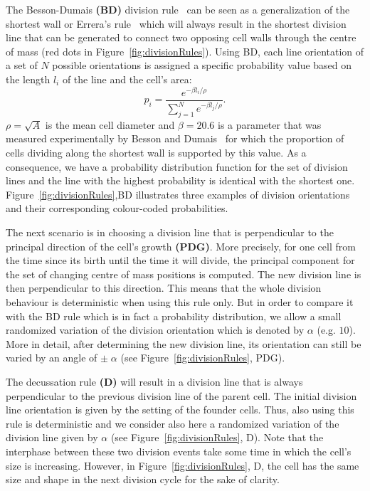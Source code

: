 \documentclass[11pt,a4paper, final]{article}
\begin{document}
The Besson-Dumais \textbf{(BD)} division rule~\cite{besson_and_dumais_2011} can be seen as a generalization of the shortest wall or Errera's rule~\cite{errera_1886} which will always result in the shortest division line that can be generated to connect two opposing cell walls through the centre of mass (red dots in Figure~\ref{fig:divisionRules}). Using BD, each line orientation of a set of $N$ possible orientations is assigned a specific probability value based on the length $l_i$ of the line and the cell's area:
\begin{equation}
p_i = \frac{e^{-\beta l_i / \rho}}{\sum_{j=1}^{N} e^{-\beta l_j / \rho}}.
\end{equation}
$\rho = \sqrt{A}$ is the mean cell diameter and $\beta = 20.6$ is a parameter that was measured experimentally by Besson and Dumais~\cite{besson_and_dumais_2011} for which the proportion of cells dividing along the shortest wall is supported by this value. As a consequence, we have a probability distribution function for the set of division lines and the line with the highest probability is identical with the shortest one. Figure~\ref{fig:divisionRules},BD illustrates three examples of division orientations and their corresponding colour-coded probabilities.

The next scenario is in choosing a division line that is perpendicular to the principal direction of the cell's growth \textbf{(PDG)}. More precisely, for one cell from the time since its birth until the time it will divide, the principal component for the set of changing centre of mass positions is computed. The new division line is then perpendicular to this direction. This means that the whole division behaviour is deterministic when using this rule only. But in order to compare it with the BD rule which is in fact a probability distribution, we allow a small randomized variation of the division orientation which is denoted by $\alpha$ (e.g. $10$). More in detail, after determining the new division line, its orientation can still be varied by an angle of $\pm \; \alpha$ (see Figure~\ref{fig:divisionRules}, PDG).

The decussation rule \textbf{(D)} will result in a division line that is always perpendicular to the previous division line of the parent cell. The initial division line orientation is given by the setting of the founder cells. Thus, also using this rule is deterministic and we consider also here a randomized variation of the division line given by $\alpha$ (see Figure~\ref{fig:divisionRules}, D). Note that the interphase between these two division events take some time in which the cell's size is increasing. However, in Figure~\ref{fig:divisionRules}, D, the cell has the same size and shape in the next division cycle for the sake of clarity.
\end{document}

